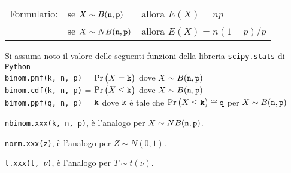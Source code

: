 \documentclass[11pt,twoside,a4paper]{article}
\begin{document}
\vfill\hrulefill\par
\begin{tabular}{@{}lll}
Formulario:& se $X\sim B({\tt n},{\tt p})$ & allora $E(X)=np$\\
           & se $X\sim NB({\tt n},{\tt p})$& allora $E(X)=n(1-p)/p$
\end{tabular}

Si assuma noto il valore delle seguenti funzioni della libreria {\tt scipy.stats\/} di  {\tt Python\/}\\
{\tt binom.pmf(k, n, p)} = $\Pr\big(X={\tt k}\big)$ dove $X\sim B({\tt n},{\tt p})$\\
{\tt binom.cdf(k, n, p)} = $\Pr\big(X\le{\tt k}\big)$ dove  $X\sim B({\tt n},{\tt p})$ \\
{\tt bimom.ppf(q, n, p)} = ${\tt k}$ dove ${\tt k}$ è tale che $\Pr\big(X\le{\tt k}\big)\cong{\tt q}$ per $X\sim B({\tt n},{\tt p})$ 

{\tt nbinom.xxx(k, n, p)}, è l'analogo per $X\sim NB({\tt n},{\tt p})$.

{\tt norm.xxx(z)}, è l'analogo per $Z\sim N(0,1)$.

{\tt t.xxx(t, $\nu$)}, è l'analogo per $T\sim t(\nu)$.
\end{document}
